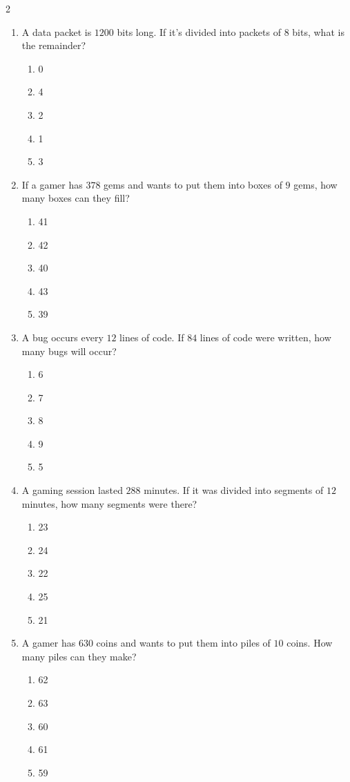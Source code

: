 \documentclass[10pt]{article}
\begin{document}
\begin{multicols}{2}
\begin{enumerate}[label=\textbf{Q\arabic*.}, leftmargin=*, itemsep=6pt, parsep=0pt]
  \item \small A data packet is $1200$ bits long. If it's divided into packets of $8$ bits, what is the remainder?
  \begin{enumerate}[label=(\Alph*), leftmargin=0.6cm, nosep, itemsep=2pt]
    \item 0
    \item 4
    \item 2
    \item 1
    \item 3
  \end{enumerate}

  \item \small If a gamer has $378$ gems and wants to put them into boxes of $9$ gems, how many boxes can they fill?
  \begin{enumerate}[label=(\Alph*), leftmargin=0.6cm, nosep, itemsep=2pt]
    \item 41
    \item 42
    \item 40
    \item 43
    \item 39
  \end{enumerate}

  \item \small A bug occurs every $12$ lines of code. If $84$ lines of code were written, how many bugs will occur?
  \begin{enumerate}[label=(\Alph*), leftmargin=0.6cm, nosep, itemsep=2pt]
    \item 6
    \item 7
    \item 8
    \item 9
    \item 5
  \end{enumerate}

  \item \small A gaming session lasted $288$ minutes. If it was divided into segments of $12$ minutes, how many segments were there?
  \begin{enumerate}[label=(\Alph*), leftmargin=0.6cm, nosep, itemsep=2pt]
    \item 23
    \item 24
    \item 22
    \item 25
    \item 21
  \end{enumerate}

  \item \small A gamer has $630$ coins and wants to put them into piles of $10$ coins. How many piles can they make?
  \begin{enumerate}[label=(\Alph*), leftmargin=0.6cm, nosep, itemsep=2pt]
    \item 62
    \item 63
    \item 60
    \item 61
    \item 59
  \end{enumerate}


\end{enumerate}
\end{multicols}
\end{document}
